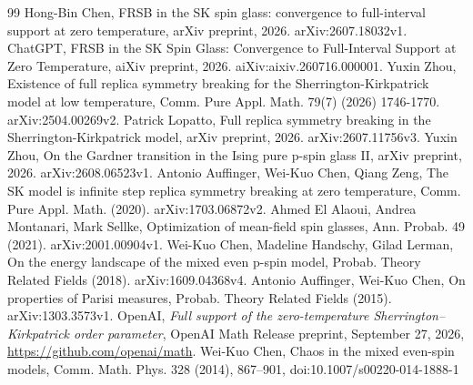 \documentclass[11pt]{article}
\begin{document}
\space%

\begin{thebibliography}{99}
\small
{} Hong-Bin Chen, FRSB in the SK spin glass: convergence to full-interval support at zero temperature, arXiv preprint, 2026. arXiv:2607.18032v1.
 ChatGPT, FRSB in the SK Spin Glass: Convergence to Full-Interval Support at Zero Temperature, aiXiv preprint, 2026. aiXiv:aixiv.260716.000001.
 Yuxin Zhou, Existence of full replica symmetry breaking for the Sherrington-Kirkpatrick model at low temperature, Comm. Pure Appl. Math. 79(7) (2026) 1746-1770. arXiv:2504.00269v2.
 Patrick Lopatto, Full replica symmetry breaking in the Sherrington-Kirkpatrick model, arXiv preprint, 2026. arXiv:2607.11756v3.
 Yuxin Zhou, On the Gardner transition in the Ising pure p-spin glass II, arXiv preprint, 2026. arXiv:2608.06523v1.
 Antonio Auffinger, Wei-Kuo Chen, Qiang Zeng, The SK model is infinite step replica symmetry breaking at zero temperature, Comm. Pure Appl. Math. (2020). arXiv:1703.06872v2.
 Ahmed El Alaoui, Andrea Montanari, Mark Sellke, Optimization of mean-field spin glasses, Ann. Probab. 49 (2021). arXiv:2001.00904v1.
 Wei-Kuo Chen, Madeline Handschy, Gilad Lerman, On the energy landscape of the mixed even p-spin model, Probab. Theory Related Fields (2018). arXiv:1609.04368v4.
 Antonio Auffinger, Wei-Kuo Chen, On properties of Parisi measures, Probab. Theory Related Fields (2015). arXiv:1303.3573v1.
 OpenAI, \emph{Full support of the zero-temperature Sherrington--Kirkpatrick order parameter}, OpenAI Math Release preprint, September 27, 2026, \url{https://github.com/openai/math}.
 Wei-Kuo Chen, Chaos in the mixed even-spin models, Comm. Math. Phys. 328 (2014), 867--901, doi:10.1007/s00220-014-1888-1
\end{thebibliography}
\space%
\end{document}
